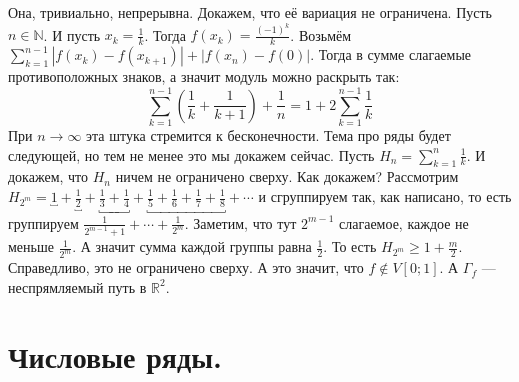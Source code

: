 \documentclass{article}
\begin{document}
\begin{itemize}
\begin{Proof}
\begin{center}
            \end{center}
            Она, тривиально, непрерывна. Докажем, что её вариация не ограничена. Пусть $n\in\mathbb N$. И пусть $x_k=\frac1k$. Тогда $f(x_k)=\frac{(-1)^k}k$. Возьмём $\sum\limits_{k=1}^{n-1}|f(x_k)-f(x_{k+1})|+|f(x_n)-f(0)|$. Тогда в сумме слагаемые противоположных знаков, а значит модуль можно раскрыть так:
            \[
            \sum\limits_{k=1}^{n-1}\left(\frac1k+\frac1{k+1}\right)+\frac1n=1+2\sum\limits_{k=1}^{n-1}\frac1k
            \]
            При $n\to\infty$ эта штука стремится к бесконечности. Тема про ряды будет следующей, но тем не менее это мы докажем сейчас. Пусть $H_n=\sum\limits_{k=1}^n\frac1k$. И докажем, что $H_n$ ничем не ограничено сверху. Как докажем? Рассмотрим $H_{2^m}=\underbracket{1}+\underbracket{\frac12}+\underbracket{\frac13+\frac14}+\underbracket{\frac15+\frac16+\frac17+\frac18}+\cdots$ и сгруппируем так, как написано, то есть группируем $\frac1{2^{m-1}+1}+\cdots+\frac1{2^m}$. Заметим, что тут $2^{m-1}$ слагаемое, каждое не меньше $\frac1{2^m}$. А значит сумма каждой группы равна $\frac12$. То есть $H_{2^m}\geqslant1+\frac m2$. Справедливо, это не ограничено сверху. А это значит, что $f\notin V[0;1]$. А $\Gamma_f$ --- неспрямляемый путь в $\mathbb R^2$.
        \end{Proof}
    \end{itemize}
    \section{Числовые ряды.}
\end{document}
